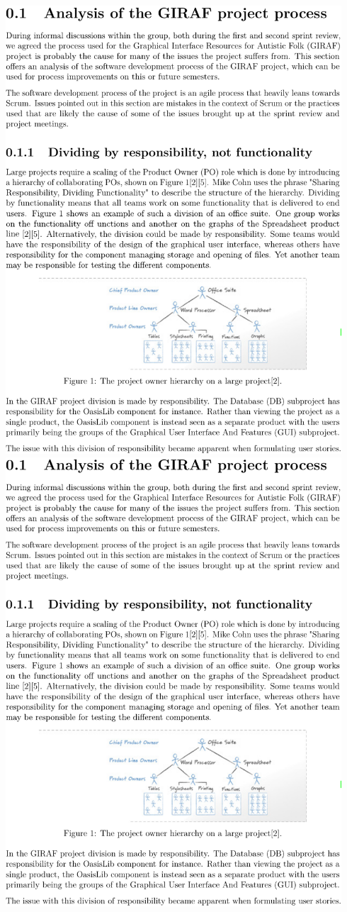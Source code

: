\includegraphics[page=2,width=0.94\textwidth]{part_appendix/sw601f15.pdf}\clearpage{}
\includegraphics[page=3,width=0.94\textwidth]{part_appendix/sw601f15.pdf}\clearpage{}

